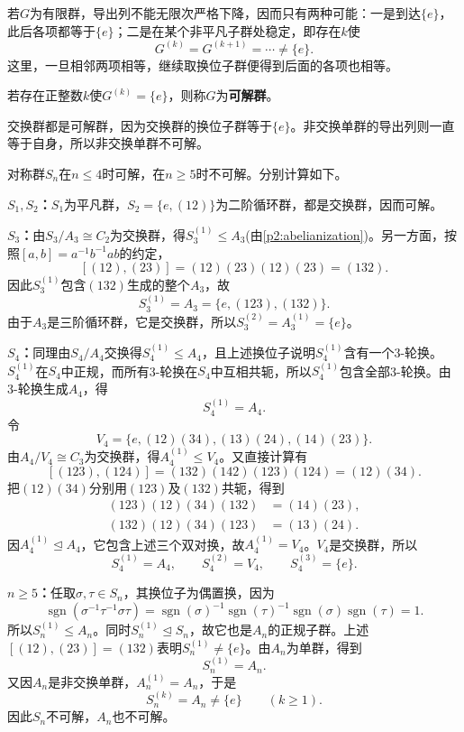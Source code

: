 若$G$为有限群，导出列不能无限次严格下降，因而只有两种可能：一是到达$\{e\}$，此后各项都等于$\{e\}$；二是在某个非平凡子群处稳定，即存在$k$使
\[
G^{(k)}=G^{(k+1)}=\cdots\ne\{e\}.
\]
这里，一旦相邻两项相等，继续取换位子群便得到后面的各项也相等。

\begin{definition}
\label{p2:concept:c2-l522}若存在正整数$k$使$G^{(k)}=\{e\}$，则称$G$为\textbf{可解群}。
\end{definition}

交换群都是可解群，因为交换群的换位子群等于$\{e\}$。非交换单群的导出列则一直等于自身，所以非交换单群不可解。

\begin{example}
对称群$S_n$在$n\leq4$时可解，在$n\geq5$时不可解。分别计算如下。

\textbf{$S_1,S_2$：}$S_1$为平凡群，$S_2=\{e,(12)\}$为二阶循环群，都是交换群，因而可解。

\textbf{$S_3$：}由$S_3/A_3\cong C_2$为交换群，得$S_3^{(1)}\leq A_3$(由\ref{p2:abelianization})。另一方面，按照$[a,b]=a^{-1}b^{-1}ab$的约定，
\[
[(12),(23)]=(12)(23)(12)(23)=(132).
\]
因此$S_3^{(1)}$包含$(132)$生成的整个$A_3$，故
\[
S_3^{(1)}=A_3=\{e,(123),(132)\}.
\]
由于$A_3$是三阶循环群，它是交换群，所以$S_3^{(2)}=A_3^{(1)}=\{e\}$。

\textbf{$S_4$：}同理由$S_4/A_4$交换得$S_4^{(1)}\leq A_4$，且上述换位子说明$S_4^{(1)}$含有一个3-轮换。$S_4^{(1)}$在$S_4$中正规，而所有3-轮换在$S_4$中互相共轭，所以$S_4^{(1)}$包含全部3-轮换。由3-轮换生成$A_4$，得
\[
S_4^{(1)}=A_4.
\]
令
\[
V_4=\{e,(12)(34),(13)(24),(14)(23)\}.
\]
由$A_4/V_4\cong C_3$为交换群，得$A_4^{(1)}\leq V_4$。又直接计算有
\[
[(123),(124)]=(132)(142)(123)(124)=(12)(34).
 \]
把$(12)(34)$分别用$(123)$及$(132)$共轭，得到
\begin{align*}
(123)(12)(34)(132)&=(14)(23),\\
(132)(12)(34)(123)&=(13)(24).
\end{align*}
因$A_4^{(1)}\trianglelefteq A_4$，它包含上述三个双对换，故$A_4^{(1)}=V_4$。$V_4$是交换群，所以
\[
S_4^{(1)}=A_4,\qquad S_4^{(2)}=V_4,\qquad S_4^{(3)}=\{e\}.
\]

\textbf{$n\geq5$：}任取$\sigma,\tau\in S_n$，其换位子为偶置换，因为
\[
\operatorname{sgn}(\sigma^{-1}\tau^{-1}\sigma\tau)
=\operatorname{sgn}(\sigma)^{-1}\operatorname{sgn}(\tau)^{-1}
\operatorname{sgn}(\sigma)\operatorname{sgn}(\tau)=1.
\]
所以$S_n^{(1)}\leq A_n$。同时$S_n^{(1)}\trianglelefteq S_n$，故它也是$A_n$的正规子群。上述$[(12),(23)]=(132)$表明$S_n^{(1)}\ne\{e\}$。由$A_n$为单群，得到
\[
S_n^{(1)}=A_n.
\]
又因$A_n$是非交换单群，$A_n^{(1)}=A_n$，于是
\[
S_n^{(k)}=A_n\ne\{e\}\qquad(k\geq1).
\]
因此$S_n$不可解，$A_n$也不可解。
\end{example}

